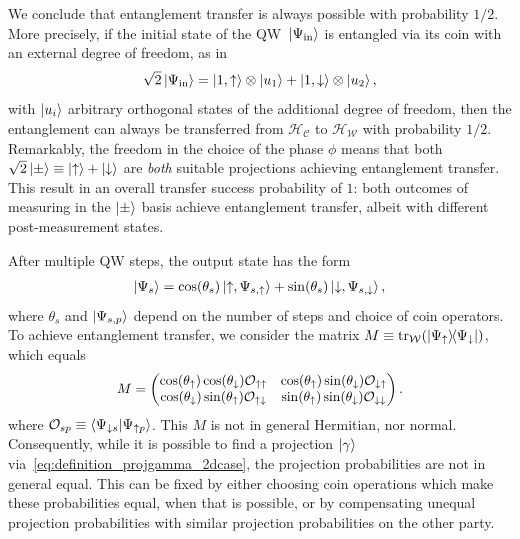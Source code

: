 \documentclass[
	aps, pra,
	superscriptaddress, twocolumn,
	floatfix,
	10pt
]{revtex4-1}
\newcommand{\on}[1]{\operatorname{#1}}
\newcommand{\parTitle}[1]{\noindent{\color{Mahogany}(\emph{#1})}}
\newcommand{\calC}{{\mathcal{C}}}
\newcommand{\calH}{{\mathcal{H}}}
\newcommand{\calO}{{\mathcal{O}}}
\newcommand{\calW}{{\mathcal{W}}}
\begin{document}
We conclude that entanglement transfer is always possible with probability $1/2$.
More precisely, if the initial state of the QW $\ket*{\Psi_{\on{in}}}$ is entangled via its coin with an external degree of freedom, as in
\begin{equation}
	\sqrt2\ket*{\Psi_{\on{in}}} = \ket{1,\uparrow} \otimes \ket{u_1} + \ket{1,\downarrow}\otimes \ket{u_2},
\end{equation}
with $\ket{u_i}$ arbitrary orthogonal states of the additional degree of freedom,
then the entanglement can always be transferred from $\calH_{\calC}$ to $\calH_{\calW}$ with probability $1/2$.
Remarkably, the freedom in the choice of the phase $\phi$ means that both $\sqrt2\ket\pm\equiv \ket\uparrow+\ket\downarrow$ are \emph{both} suitable projections achieving entanglement transfer.
This result in an overall transfer success probability of $1$: both outcomes of measuring in the $\ket\pm$ basis achieve entanglement transfer, albeit with different post-measurement states.

\parTitle{Multiple steps}
After multiple QW steps, the output state has the form
\begin{equation}
\begin{aligned}
	\ket{\Psi_s} =
	\cos(\theta_s) \ket{\uparrow,\Psi_{s,\uparrow}} +
	\sin(\theta_s) \ket{\downarrow,\Psi_{s,\downarrow}},
\end{aligned}
\end{equation}
where $\theta_s$ and $\ket{\Psi_{s,p}}$ depend on the number of steps and choice of coin operators.
To achieve entanglement transfer, we consider the matrix
$M\equiv \tr_{\calW}(\ketbra{\Psi_\uparrow}{\Psi_\downarrow})$,
which equals
\begin{equation}\scalebox{0.97}{$\displaystyle
	M = \begin{pmatrix}
		\cos(\theta_\uparrow)\cos(\theta_\downarrow) \calO_{\uparrow\uparrow} &
		\cos(\theta_\uparrow)\sin(\theta_{\downarrow}) \calO_{\downarrow\uparrow} \\
		\cos(\theta_\downarrow)\sin(\theta_{\uparrow}) \calO_{\uparrow\downarrow} &
		\sin(\theta_\uparrow)\sin(\theta_\downarrow) \calO_{\downarrow\downarrow}
	\end{pmatrix}.
$}\end{equation}
where
$\calO_{sp}\equiv\braket{\Psi_{\downarrow s}}{\Psi_{\uparrow p}}$.
This $M$ is not in general Hermitian, nor normal. Consequently, while it is possible to find a projection $\ket\gamma$ via~\cref{eq:definition_projgamma_2dcase}, the projection probabilities are not in general equal.
This can be fixed by either choosing coin operations which make these probabilities equal, when that is possible, or by compensating unequal projection probabilities with similar projection probabilities on the other party.
\end{document}
